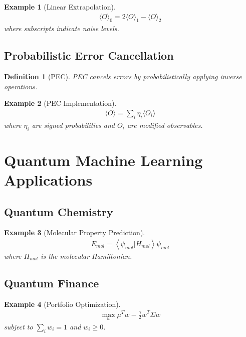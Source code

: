 \documentclass[11pt]{article}
\newtheorem{definition}{Definition}[section]
\newtheorem{example}{Example}[section]
\newcommand{\braket}[2]{\left\langle#1|#2\right\rangle}
\begin{document}
\begin{example}[Linear Extrapolation]
\begin{align}
\langle O \rangle_0 = 2\langle O \rangle_1 - \langle O \rangle_2
\end{align}
where subscripts indicate noise levels.
\end{example}

\subsection{Probabilistic Error Cancellation}

\begin{definition}[PEC]
PEC cancels errors by probabilistically applying inverse operations.
\end{definition}

\begin{example}[PEC Implementation]
\begin{align}
\langle O \rangle = \sum_i \eta_i \langle O_i \rangle
\end{align}
where $\eta_i$ are signed probabilities and $O_i$ are modified observables.
\end{example}

\section{Quantum Machine Learning Applications}

\subsection{Quantum Chemistry}

\begin{example}[Molecular Property Prediction]
\begin{align}
E_{mol} = \braket{\psi_{mol}}{H_{mol}}{\psi_{mol}}
\end{align}
where $H_{mol}$ is the molecular Hamiltonian.
\end{example}

\subsection{Quantum Finance}

\begin{example}[Portfolio Optimization]
\begin{align}
\max_w \mu^T w - \frac{\gamma}{2} w^T \Sigma w
\end{align}
subject to $\sum_i w_i = 1$ and $w_i \geq 0$.
\end{example}
\end{document}
